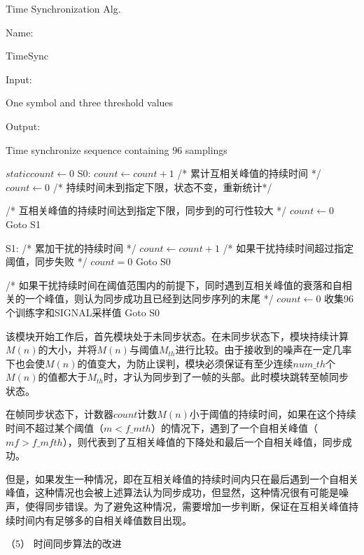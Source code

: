 \documentclass[titlepage]{article}
\numberwithin{figure}{section}
\numberwithin{equation}{section}
\begin{document}
\begin{algorithm}[H]
\caption{Time Synchronization Alg.}
Name:

TimeSync

Input:

One symbol and three threshold values

Output:

Time synchronize sequence containing 96 samplings

\begin{algorithmic}[1]

\State $static count \gets 0$
\State S0:
\State $count \gets count + 1$ /* 累计互相关峰值的持续时间 */
\Else
\State $count \gets 0$ /* 持续时间未到指定下限，状态不变，重新统计*/
\EndIf

 /* 互相关峰值的持续时间达到指定下限，同步到的可行性较大 */
\State $count \gets 0$
\State Goto S1
\EndIf

\State S1:
 /* 累加干扰的持续时间 */
\State $count \gets count + 1$
\EndIf
{} /* 如果干扰持续时间超过指定阈值，同步失败 */
\State	$count = 0$
\State Goto S0
\EndIf
		
 /* 如果干扰持续时间在阈值范围内的前提下，同时遇到互相关峰值的衰落和自相关的一个峰值，则认为同步成功且已经到达同步序列的末尾 */
\State $count \gets 0$
\State 收集96个训练字和SIGNAL采样值
\State Goto S0
\EndIf
	
\end{algorithmic}
\end{algorithm}

该模块开始工作后，首先模块处于未同步状态。在未同步状态下，模块持续计算$M(n)$的大小，并将$M(n)$与阈值$M_{th}$进行比较。由于接收到的噪声在一定几率下也会使$M(n)$的值变大，为防止误判，模块必须保证有至少连续$num\_th$个$M(n)$的值都大于$M_{th}$时，才认为同步到了一帧的头部。此时模块跳转至帧同步状态。

在帧同步状态下，计数器$count$计数$M(n)$小于阈值的持续时间，如果在这个持续时间不超过某个阈值（$m<f\_mth$）的情况下，遇到了一个自相关峰值（$mf>f\_mfth$），则代表到了互相关峰值的下降处和最后一个自相关峰值，同步成功。

但是，如果发生一种情况，即在互相关峰值的持续时间内只在最后遇到一个自相关峰值，这种情况也会被上述算法认为同步成功，但显然，这种情况很有可能是噪声，使得同步错误。为了避免这种情况，需要增加一步判断，保证在互相关峰值持续时间内有足够多的自相关峰值数目出现。

（5） 时间同步算法的改进
\end{document}
